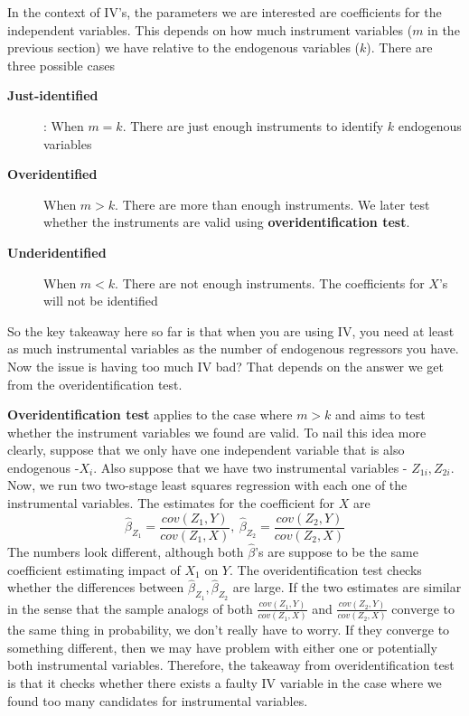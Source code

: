 In the context of IV's, the parameters we are interested are coefficients for the independent variables. This depends on how much instrument variables ($m$ in the previous section) we have relative to the endogenous variables ($k$). There are three possible cases
\begin{description}
\item[\textbf{Just-identified}]: When $m=k$. There are just enough instruments to identify $k$ endogenous variables
\item[\textbf{Overidentified}] When $m>k$. There are more than enough instruments. We later test whether the instruments are valid using \textbf{overidentification test}.
\item[\textbf{Underidentified}] When $m<k$. There are not enough instruments. The coefficients for $X$'s will not be identified 
\end{description}
So the key takeaway here so far is that when you are using IV, you need at least as much instrumental variables as the number of endogenous regressors you have. Now the issue is having too much IV bad? That depends on the answer we get from the overidentification test.\par\medskip
\textbf{Overidentification test} applies to the case where $m>k$ and aims to test whether the instrument variables we found are valid. To nail this idea more clearly, suppose that we only have one independent variable that is also endogenous  -$X_i$. Also suppose that we have two instrumental variables - $Z_{1i}, Z_{2i}$. Now, we run two two-stage least squares regression with each one of the instrumental variables. The estimates for the coefficient for $X$ are 
\[
\hat{\beta}_{Z_1}=\frac{cov(Z_1,Y)}{cov(Z_1,X)}, \ \hat{\beta}_{Z_2}=\frac{cov(Z_2,Y)}{cov(Z_2,X)}
\]
The numbers look different, although both $\hat{\beta}$'s are suppose to be the same coefficient estimating impact of $X_1$ on $Y$. The overidentification test checks whether the differences between $\hat{\beta}_{Z_1}, \hat{\beta}_{Z_2}$ are large. If the two estimates are similar in the sense that the sample analogs of both $\frac{cov(Z_1,Y)}{cov(Z_1,X)}$ and $\frac{cov(Z_2,Y)}{cov(Z_2,X)}$ converge to the same thing in probability, we don't really have to worry. If they converge to something different, then we may have problem with either one or potentially both instrumental variables. Therefore, the takeaway from overidentification test is that it checks whether there exists a faulty IV variable in the case where we found too many candidates for instrumental variables. 

